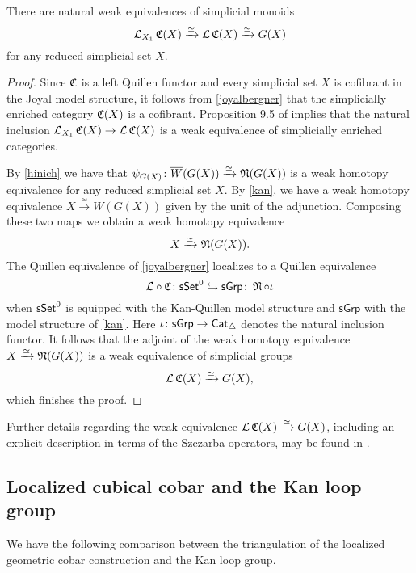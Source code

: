 \begin{lemma} \label{CandG}
	There are natural weak equivalences of simplicial monoids
	\begin{equation*}
	\mathcal{L}_{X_1} \operatorname{\mathfrak{C}}(X) \xrightarrow{\simeq} \mathcal{L}\operatorname{\mathfrak{C}}(X) \xrightarrow{\simeq} G(X)
	\end{equation*}
	for any reduced simplicial set $X$.
\end{lemma}

\begin{proof}
	Since $\operatorname{\mathfrak{C}}$ is a left Quillen functor and every simplicial set $X$ is cofibrant in the Joyal model structure, it follows from \cref{joyalbergner} that the simplicially enriched category $\operatorname{\mathfrak{C}}(X)$ is a cofibrant.
	Proposition 9.5 of \cite{dwyer1980simplicial} implies that the natural inclusion $\mathcal{L}_{X_1} \operatorname{\mathfrak{C}}(X) \to \mathcal{L}\operatorname{\mathfrak{C}}(X)$ is a weak equivalence of simplicially enriched categories.
	
	By \cref{hinich} we have that $\psi_{G(X)} \colon \overline{W}(G(X)) \xrightarrow{\simeq} \operatorname{\mathfrak{N}}(G(X))$ is a weak homotopy equivalence for any reduced simplicial set $X$.
	By \cref{kan}, we have a weak homotopy equivalence $X \xrightarrow{\simeq} \overline{W}(G(X))$ given by the unit of the adjunction.
	Composing these two maps we obtain a weak homotopy equivalence
	$$X \xrightarrow{\simeq} \operatorname{\mathfrak{N}}(G(X)).$$
	The Quillen equivalence of \cref{joyalbergner} localizes to a Quillen equivalence
	$$\mathcal{L} \circ \operatorname{\mathfrak{C}} \colon \mathsf{sSet}^0 \leftrightarrows \mathsf{sGrp} \colon \operatorname{\mathfrak{N}} \circ \iota$$
	when $\mathsf{sSet}^0$ is equipped with the Kan-Quillen model structure and $\mathsf{sGrp}$ with the model structure of \cref{kan}.
	Here $\iota \colon \mathsf{sGrp} \to \mathsf{Cat}_{\triangle}$ denotes the natural inclusion functor.
	It follows that the adjoint of the weak homotopy equivalence $X \xrightarrow{\simeq} \operatorname{\mathfrak{N}}(G(X))$ is a weak equivalence of simplicial groups
	$$\mathcal{L}\operatorname{\mathfrak{C}}(X) \xrightarrow{\simeq} G(X),$$
	which finishes the proof.
\end{proof}

Further details regarding the weak equivalence $\mathcal{L} \operatorname{\mathfrak{C}}(X) \xrightarrow{\simeq} G(X)$, including an explicit description in terms of the Szczarba operators, may be found in \cite{minichello2021path}.

\subsection{Localized cubical cobar and the Kan loop group}

We have the following comparison between the triangulation of the localized geometric cobar construction and the Kan loop group.

